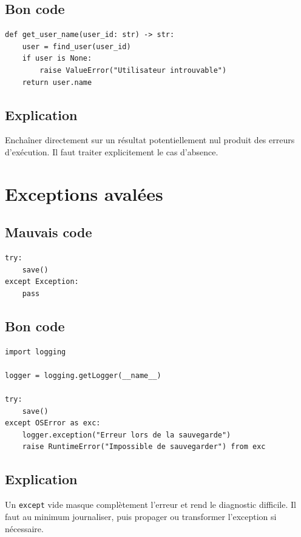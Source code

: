 \documentclass[a4paper,11pt]{report}
\begin{document}
\section{Bon code}
\begin{lstlisting}
def get_user_name(user_id: str) -> str:
    user = find_user(user_id)
    if user is None:
        raise ValueError("Utilisateur introuvable")
    return user.name
\end{lstlisting}

\section{Explication}
Enchaîner directement sur un résultat potentiellement nul produit des erreurs d'exécution.
Il faut traiter explicitement le cas d'absence.

\chapter{Exceptions avalées}

\section{Mauvais code}
\begin{lstlisting}
try:
    save()
except Exception:
    pass
\end{lstlisting}

\section{Bon code}
\begin{lstlisting}
import logging

logger = logging.getLogger(__name__)

try:
    save()
except OSError as exc:
    logger.exception("Erreur lors de la sauvegarde")
    raise RuntimeError("Impossible de sauvegarder") from exc
\end{lstlisting}

\section{Explication}
Un \texttt{except} vide masque complètement l'erreur et rend le diagnostic difficile.
Il faut au minimum journaliser, puis propager ou transformer l'exception si nécessaire.

\end{document}
